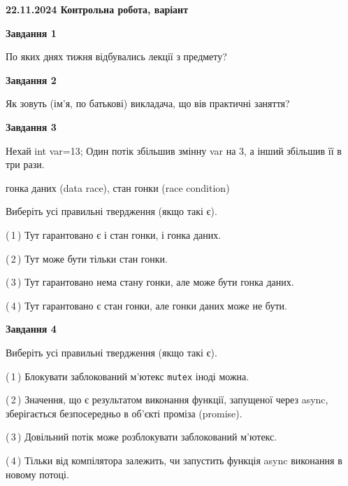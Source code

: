 \documentclass[12pt, ukrainian]{article}
\def\code#1{\Verb!#1!}
\begin{document}
\begin {large}

\textbf{22.11.2024 Контрольна робота, варіант  }\par


{

\begin{center}
\textbf{Завдання 1}
\end{center}

По яких днях тижня відбувались лекції з предмету?


\begin{center}
\textbf{Завдання 2}
\end{center}

Як зовуть (ім'я, по батькові) викладача, що вів практичні заняття?


\begin{center}
\textbf{Завдання 3}
\end{center}

Нехай int var=13; Один потік збільшив змінну var на 3, а інший збільшив її в три рази.

гонка даних (data race), стан гонки (race condition)

Виберіть усі правильні твердження (якщо такі є).\par
\vspace{2mm}
(\,1\,) Тут гарантовано є і стан гонки, і гонка даних.%

(\,2\,) Тут може бути тільки стан гонки.%

(\,3\,) Тут гарантовано нема стану гонки, але може бути гонка даних.%

(\,4\,) Тут гарантовано є стан гонки, але гонки даних може не бути.%


\begin{center}
\textbf{Завдання 4}
\end{center}

Виберіть усі правильні твердження (якщо такі є).\par
\vspace{2mm}

(\,1\,) Блокувати заблокований м’ютекс  \code{mutex} іноді можна.%

(\,2\,) Значення, що є результатом виконання функції, запущеної через async, зберігається безпосередньо в об’єкті проміза (promise).%

(\,3\,) Довільний потік може розблокувати заблокований м’ютекс.%

(\,4\,) Тільки від компілятора залежить, чи запустить функція async виконання в новому потоці.%


}
\end{large}
\end{document}
